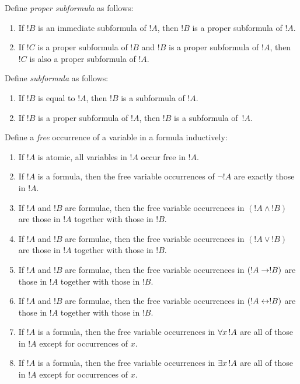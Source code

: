 \documentclass[open-logic-section]{subfiles}
\begin{document}
\begin{defn}
Define \emph{proper subformula} as follows:
\begin{enumerate}
\item If $!B$ is an immediate subformula of $!A$, then $!B$ is a
  proper subformula of $!A$.
\item If $!C$ is a proper subformula of $!B$ and $!B$ is a proper
  subformula of $!A$, then $!C$ is also a proper subformula of $!A$.
\end{enumerate}
\end{defn}

\begin{defn}[Subformula]
Define \emph{subformula} as follows:
\begin{enumerate}
\item If $!B$ is equal to $!A$, then $!B$ is a subformula of $!A$.
\item If $!B$ is a proper subformula of $!A$, then $!B$ is a
  subformula of~$!A$.
\end{enumerate}
\end{defn}


\begin{defn}
Define a \emph{free} occurrence of a variable in a formula inductively:
\begin{enumerate}
\item If $!A$ is atomic, all variables in $!A$ occur free in $!A$.
\item If $!A$ is a formula, then the free variable occurrences of
  $\lnot !A$ are exactly those in $!A$.
\item If $!A$ and $!B$ are formulae, then the free variable
  occurrences in $(!A \land !B)$ are those in $!A$ together with those
  in $!B$.
\item If $!A$ and $!B$ are formulae, then the free variable
  occurrences in $(!A \lor !B)$ are those in $!A$ together with those
  in $!B$.
\item If $!A$ and $!B$ are formulae, then the free variable
  occurrences in $(!A \to !B)$ are those in $!A$ together with those
  in $!B$.
\item If $!A$ and $!B$ are formulae, then the free variable
  occurrences in $(!A \leftrightarrow !B)$ are those in $!A$ together with those
  in $!B$.
\item If $!A$ is a formula, then the free variable occurrences in
  $\lforall[x][!A]$ are all of those in $!A$ except for occurrences of
  $x$.
\item If $!A$ is a formula, then the free variable occurrences in
  $\lexists[x][!A]$ are all of those in $!A$ except for occurrences of
  $x$.
\end{enumerate}
\end{defn}
\end{document}

